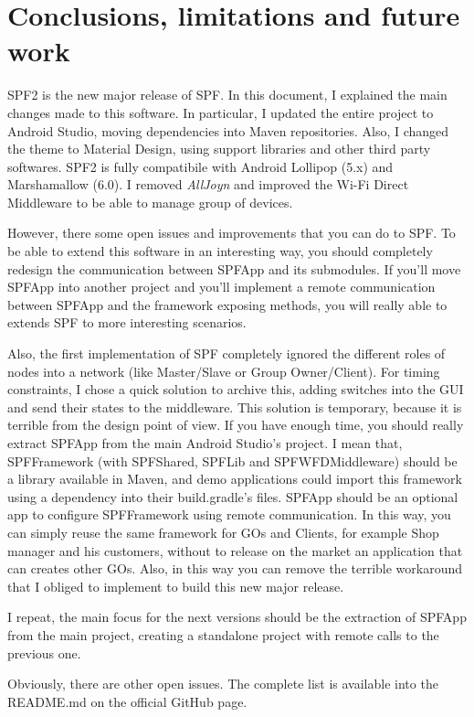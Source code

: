 \chapter{Conclusions, limitations and future work}
\label{conclusion}

SPF2 is the new major release of SPF. In this document, I explained the main changes made to this software. In particular, I updated the entire project to Android Studio, moving dependencies into Maven repositories. Also, I changed the theme to Material Design, using support libraries and other third party softwares. SPF2 is fully compatibile with Android Lollipop (5.x) and Marshamallow (6.0). I removed \emph{AllJoyn} and improved the Wi-Fi Direct Middleware to be able to manage group of devices.

However, there some open issues and improvements that you can do to SPF. To be able to extend this software in an interesting way, you should completely redesign the communication between SPFApp and its submodules. If you'll move SPFApp into another project and you'll implement a remote communication between SPFApp and the framework exposing methods, you will really able to extends SPF to more interesting scenarios.

Also, the first implementation of SPF completely ignored the different roles of nodes into a network (like Master/Slave or Group Owner/Client). For timing constraints, I chose a quick solution to archive this, adding switches into the GUI and send their states to the middleware. This solution is temporary, because it is terrible from the design point of view. If you have enough time, you should really extract \textsf{SPFApp} from the main Android Studio's project. I mean that, \textsf{SPFFramework} (with \textsf{SPFShared}, \textsf{SPFLib} and \textsf{SPFWFDMiddleware}) should be a library available in Maven, and demo applications could import this framework using a dependency into their \textsf{build.gradle}'s files. \textsf{SPFApp} should be an optional app to configure \textsf{SPFFramework} using remote communication. In this way, you can simply reuse the same framework for GOs and Clients, for example Shop manager and his customers, without to release on the market an application that can creates other GOs. Also, in this way you can remove the terrible workaround that I obliged to implement to build this new major release.

I repeat, the main focus for the next versions should be the extraction of \textsf{SPFApp} from the main project, creating a standalone project with remote calls to the previous one.

Obviously, there are other open issues. The complete list is available into the \textsf{README.md} on the official GitHub page.